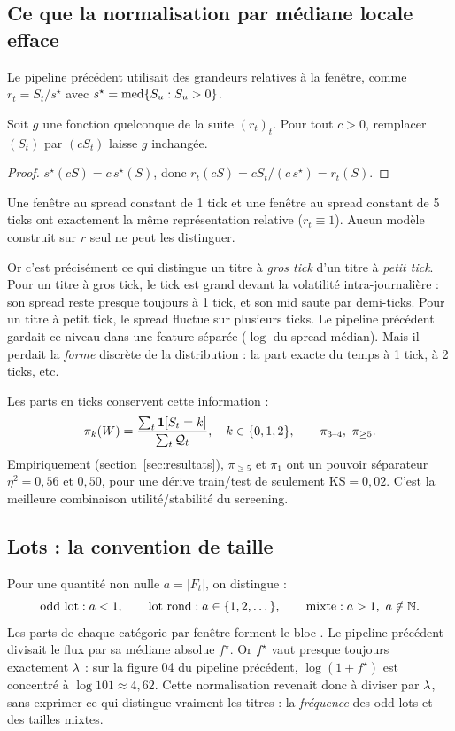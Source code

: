 \subsection{Ce que la normalisation par médiane locale efface}
Le pipeline précédent utilisait des grandeurs relatives à la fenêtre, comme $r_t=S_t/s^\star$ avec $s^\star=\operatorname{med}\{S_u:S_u>0\}$.

\begin{proposition}\label{prop:scale}
Soit $g$ une fonction quelconque de la suite $(r_t)_t$. Pour tout $c>0$, remplacer $(S_t)$ par $(cS_t)$ laisse $g$ inchangée.
\end{proposition}
\begin{proof}
$s^\star(cS)=c\,s^\star(S)$, donc $r_t(cS)=cS_t/(c\,s^\star)=r_t(S)$.
\end{proof}
\begin{corollaire}
Une fenêtre au spread constant de 1 tick et une fenêtre au spread constant de 5 ticks ont exactement la même représentation relative ($r_t\equiv1$). Aucun modèle construit sur $r$ seul ne peut les distinguer.
\end{corollaire}
\noindent Or c'est précisément ce qui distingue un titre à \emph{gros tick} d'un titre à \emph{petit tick}. Pour un titre à gros tick, le tick est grand devant la volatilité intra-journalière : son spread reste presque toujours à 1 tick, et son mid saute par demi-ticks. Pour un titre à petit tick, le spread fluctue sur plusieurs ticks. Le pipeline précédent gardait ce niveau dans une feature séparée ($\log$ du spread médian). Mais il perdait la \emph{forme} discrète de la distribution : la part exacte du temps à 1 tick, à 2 ticks, etc.

Les parts en ticks conservent cette information :
\begin{equation}
\pi_k(W)=\frac{\sum_t\mathbf{1}\!\left[S_t=k\right]}{\sum_t\mathcal{Q}_t},\quad k\in\{0,1,2\},\qquad \pi_{3\text{--}4},\ \pi_{\ge5}.
\end{equation}
Empiriquement (section~\ref{sec:resultats}), $\pi_{\ge5}$ et $\pi_1$ ont un pouvoir séparateur $\eta^2=0{,}56$ et $0{,}50$, pour une dérive train/test de seulement $\mathrm{KS}=0{,}02$. C'est la meilleure combinaison utilité/stabilité du screening.

\subsection{Lots : la convention de taille}
Pour une quantité non nulle $a=|F_t|$, on distingue :
\begin{equation}
\text{odd lot}: a<1,\qquad \text{lot rond}: a\in\{1,2,\dots\},\qquad \text{mixte}: a>1,\ a\notin\mathbb{N} .
\end{equation}
Les parts de chaque catégorie par fenêtre forment le bloc . Le pipeline précédent divisait le flux par sa médiane absolue $f^\star$. Or $f^\star$ vaut presque toujours exactement $\lambda$ : sur la figure 04 du pipeline précédent, $\log(1+f^\star)$ est concentré à $\log 101\approx4{,}62$. Cette normalisation revenait donc à diviser par $\lambda$, sans exprimer ce qui distingue vraiment les titres : la \emph{fréquence} des odd lots et des tailles mixtes.

